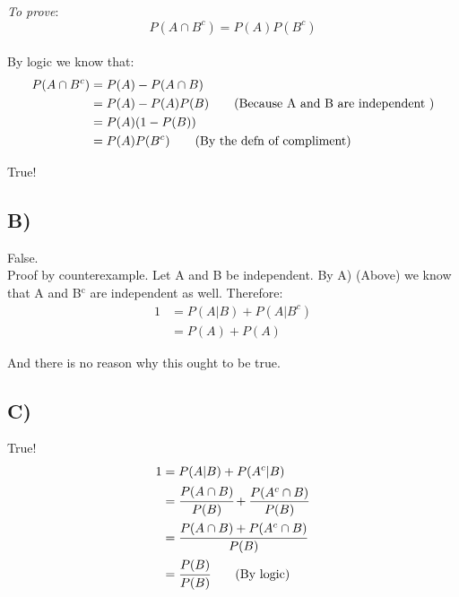 \documentclass[11pt]{article}
\begin{document}
\emph{To prove}: $$P(A \cap B^{c}) = P(A)P(B^{c})$$\\
By logic we know that:
\begin{align}
  P(A \cap B^{c}) &= P(A) - P(A \cap B)\\
                  &= P(A) - P(A)P(B) \tag{$\text{Because A and B are independent }$}\\
                  &= P(A)(1- P(B))\\
                  &= P(A)P(B^{c}) \tag{$\text{By the defn of compliment}$}
\end{align}

True!

\subsection*{B)}
\label{sec:org66a815d}

False.\\
Proof by counterexample. Let A and B be independent. By A) (Above) we know that A and B\(^{\text{c}}\) are independent as well. Therefore:\\
\begin{align}
  1 &= P(A|B) + P(A|B^{c})\\ 
  &= P(A) + P(A) \tag{by the defn. of independence. }
\end{align}

And there is no reason why this ought to be true.

\subsection*{C)}
\label{sec:org7acb5d9}
True!
\begin{align}
  1 &= P(A|B) + P(A^{c}|B) \\
  &= \cfrac{P(A \cap B)}{P(B)} + \frac{P(A^{c} \cap B)}{P(B)}\\
  &=\cfrac{P(A \cap B ) + P(A^{c}\cap B)}{P(B)}\\
  &= \cfrac{P(B)}{P(B)} \tag{By logic}
\end{align}
\end{document}
